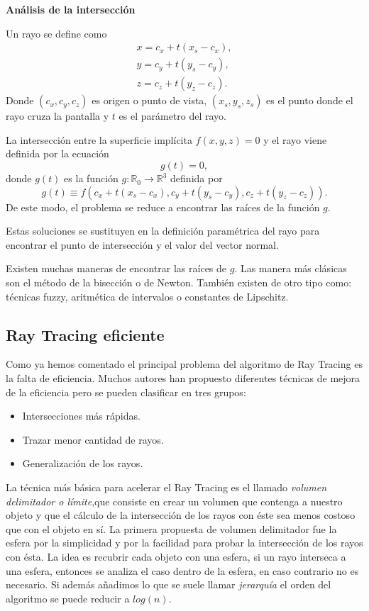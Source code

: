 \textbf{Análisis de la intersección}

Un rayo se define como
\begin{equation}
\begin{split}
x = c_x + t(x_s - c_x), \\
y = c_y + t(y_s - c_y), \\
z = c_z + t(y_z - c_z).
\end{split}
\nonumber
\end{equation}
Donde $(c_x,c_y,c_z)$ es origen o punto de vista, $(x_s,y_s,z_s)$ es el punto donde el rayo cruza la pantalla y $t$ es el parámetro del rayo.

La intersección entre la superficie implícita $f(x,y,z) = 0$ y el rayo viene definida por la ecuación
$$g(t) = 0,$$
donde $g(t)$ es la función $g : \mathbb{R}_0 \to \mathbb{R}^3$ definida por
\begin{equation}
g(t) \equiv f(c_x + t(x_s - c_x), c_y + t(y_s - c_y), c_z + t(y_z - c_z)).
\nonumber
\end{equation}
De este modo, el problema se reduce a encontrar las raíces de la función $g$.

Estas soluciones se sustituyen en la definición paramétrica del rayo para encontrar el punto de intersección y el valor del vector normal.

Existen muchas maneras  de encontrar las raíces de $g$. Las manera más clásicas son el método de la bisección o de Newton\cite{Hart01}. También existen de otro tipo como: técnicas fuzzy\cite{Foufou96}, aritmética de intervalos\cite{Mitchell90} o constantes de Lipschitz\cite{Kalra89}.
\subsection{Ray Tracing eficiente}

Como ya hemos comentado el principal problema del algoritmo de Ray Tracing es la falta de eficiencia. Muchos autores han propuesto diferentes técnicas de mejora de la eficiencia pero se pueden clasificar en tres grupos:
\begin{itemize}
\item Intersecciones más rápidas.
\item Trazar menor cantidad de rayos.
\item Generalización de los rayos.
\end{itemize}

La técnica más básica para acelerar el Ray Tracing es el llamado{ \em volumen delimitador o límite},que consiste en crear un volumen que contenga a nuestro objeto y que el cálculo de la intersección de los rayos con éste sea menos costoso que con el objeto en sí. La primera propuesta de volumen delimitador fue la esfera\cite{Whitted80} por la simplicidad y por la facilidad para probar la intersección de los rayos con ésta. La idea es recubrir cada objeto con una esfera, si un rayo interseca a una esfera, entonces se analiza el caso dentro de la esfera, en caso contrario no es necesario. Si además añadimos lo que se suele llamar{ \em jerarquía} el orden del algoritmo se puede reducir a $log(n)$.

